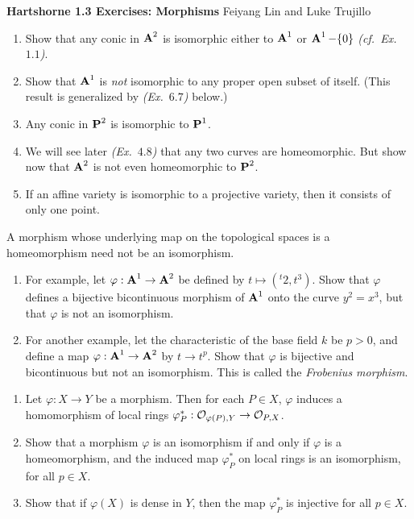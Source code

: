 \documentclass[10pt]{amsart}
\newcommand{\header}[2]{
    {\noindent
    {\Large \bf Hartshorne #1 Exercises: #2}
    \hfill 
    {\large Feiyang Lin and Luke Trujillo}
    \vspace{0.5cm}}
}
\begin{document}
\header{1.3}{Morphisms}

\begin{exercise}[3.1]
    \begin{enumerate}[itemsep=1pt]
    \item Show that any conic in $\aa^2$ is isomorphic either to $\aa^1$ or
        $\aa^1 - \{0\}$ \emph{(cf.\ Ex.~$1.1$)}.
    \item Show that $\aa^1$ is \emph{not} isomorphic to any proper open subset
        of itself. (This result is generalized by \emph{(Ex.~$6.7$)} below.)
    \item Any conic in $\pp^2$ is isomorphic to $\pp^1$.
    \item We will see later \emph{(Ex.\ $4.8$)} that any two curves are
        homeomorphic. But show now that $\aa^2$ is not even homeomorphic to
        $\pp^2$.
    \item If an affine variety is isomorphic to a projective variety, then it
        consists of only one point.
    \end{enumerate}
\end{exercise}


\begin{exercise}[3.2]
    A morphism whose underlying map on the topological spaces 
    is a homeomorphism need not be an isomorphism.
    \begin{enumerate}[itemsep=1pt]
        \item For example, let $\varphi : \aa^1  \to \aa^2$ be defined by 
        $t \mapsto (^t2,t^3)$. Show that $\varphi$ defines a
        bijective bicontinuous morphism of $\aa^1$ onto the curve $y^2 = x^3$, 
        but that $\varphi$ is not an isomorphism.

        \item For another example, let the characteristic of the base field $k$ be $p > 0$, and
        define a map $\varphi : \aa^1 \to \aa^2$ by $t \to t^p$. Show that $\varphi$ 
        is bijective and bicontinuous but not an isomorphism. 
        This is called the \emph{Frobenius morphism}.
    \end{enumerate}
\end{exercise}


\begin{exercise}[3.3]
    \begin{enumerate}[itemsep=1pt]
        \item 
        Let $\varphi:X \to Y$ be a morphism. Then for each $P \in X$, $\varphi$ 
        induces a homomorphism of local rings 
        $\varphi_P^*: \cO_{\varphi(P), Y} \to \cO_{P, X}$.

        \item Show that a morphism $\varphi$ is an isomorphism if and only if $\varphi$ is a 
        homeomorphism, and the induced map $\varphi_P^*$ on local rings 
        is an isomorphism, for all $p \in X$. 

        \item Show that if $\varphi(X)$ is dense in $Y$, 
        then the map $\varphi_P^*$ is injective for all $p \in X$.
    \end{enumerate}
    
\end{exercise}
\end{document}
